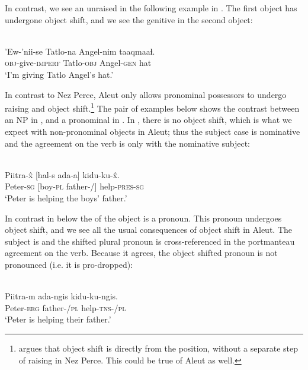 \documentclass[output=paper]{LSP/langsci}
\begin{document}
In contrast, we see an unraised  in the following example in . The first object has undergone object shift, and we see the genitive  in the second object:

\ea\label{ex:woolford:36}
\\
\gll ’Ew-’nii-se    Tatlo-na   Angel-nim   taaqmaaɬ.\\
     \textsc{obj}-give-\textsc{imperf}  Tatlo-\textsc{obj}  Angel-\textsc{gen}  hat    \\
\glt ‘I’m giving Tatlo Angel’s hat.’
\z

In contrast to Nez Perce, Aleut only allows pronominal possessors to undergo  raising and object shift.\footnote{\citet{Deal2013} argues that object shift is directly from the  position, without a separate step of  raising in Nez Perce. This could be true of Aleut as well.} The pair of examples below shows the contrast between an NP  in , and a pronominal  in . In , there is no object shift, which is what we expect with non-pronominal objects in Aleut; thus the subject case is nominative and the agreement on the verb is only with the nominative subject:

\ea\label{ex:woolford:37}
\\
\gll Piitra-\^{x}     [hal-s    ada-a]   kidu-ku-\^{x}.\\
     Peter-\textsc{sg}  [boy-\textsc{pl}  father-/]  help-\textsc{pres}-\textsc{sg}    \\
\glt ‘Peter is helping the boys' father.'  
\z

In contrast in  below the  of the object is a pronoun. This pronoun undergoes object shift, and we see all the usual consequences of object shift in Aleut. The subject is  and the shifted plural pronoun is cross-referenced in the portmanteau agreement on the verb. Because it agrees, the object shifted pronoun is not pronounced (i.e. it is pro-dropped):

\ea\label{ex:woolford:38}
\\
\gll Piitra-m    ada-ngis  kidu-ku-ngis.      \\
     Peter-\textsc{erg}  father-/\textsc{pl}  help-\textsc{tns}-/\textsc{pl} \\
\glt ‘Peter is helping their father.’
\z
\end{document}
